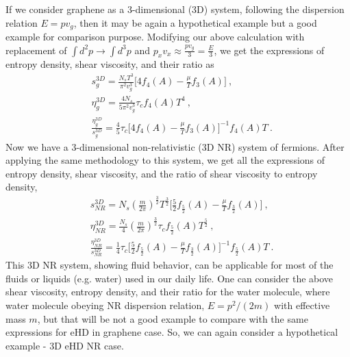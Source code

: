 \documentclass[amsmath,amssymb,aps,prb]{revtex4-2}
\begin{document}
    If we consider graphene as a 3-dimensional (3D) system, following the dispersion relation $E=pv_g$, then it may be again a hypothetical example but a good example for comparison purpose. Modifying our above calculation with replacement of $\int d^2p\rightarrow \int d^3p$ and $p_xv_x\approx \frac{pv_g}{3}=\frac{E}{3}$, we get the expressions of entropy density, shear viscosity, and their ratio as
    \begin{align}
    & s_g^{3D} = \frac{N_s T^3}{\pi^2 v_g^3} \Bigg[4f_4\left(A\right) - \frac{\mu}{T} f_3\left(A\right) \Bigg]~,
    \label{sg_3D}
    \\
    & \eta_{g}^{3D} = \frac{4 N_s }{5 \pi^2 v_g^3} \tau_c f_4\left(A\right) T^4~,
    \label{eg_3D}
    \\
    & \frac{\eta_g^{3D}}{ s_g^{3D}} = \frac{4}{5} \tau_c \Bigg[4f_4\left(A\right) - \frac{\mu}{T} f_3\left(A\right) \Bigg]^{-1}  f_4\left(A\right) T~.
    \label{esg_3D}
    \end{align}
%
    Now we have a 3-dimensional non-relativistic (3D NR) system of fermions. After applying the same methodology to this system, we get all the expressions of entropy density, shear viscosity, and the ratio of shear viscosity to entropy density,
%
    \begin{align}
    & s_{NR}^{3D} = N_s \left( \frac{m}{2 \pi }\right)^{\frac{3}{2}} T^{\frac{3}{2}} \Bigg[\frac{5}{2} f_{\frac{5}{2}}\left(A\right) - \frac{\mu}{T} f_{\frac{3}{2}}\left(A\right) \Bigg]~,
    \label{sNR_3D}
    \\
    & \eta_{NR}^{3D} = \frac{N_s}{4} \left( \frac{m}{2 \pi }\right)^{\frac{3}{2}} \tau_c f_{\frac{5}{2}}\left(A\right) T^{\frac{5}{2}}~,
    \label{eNR_3D}
    \\
     & \frac{\eta_{NR}^{3D}}{ s_{NR}^{3D}} = \frac{1}{4} \tau_c \Bigg[\frac{5}{2} f_{\frac{5}{2}}\left(A\right) - \frac{\mu}{T} f_{\frac{3}{2}}\left(A\right) \Bigg]^{-1} f_{\frac{5}{2}}\left(A\right) T~.
     \label{esNR_3D}
    \end{align}
    This 3D NR system, showing fluid behavior, can be applicable for most of the fluids or liquids (e.g. water) used in our daily life.  
    One can consider the above shear viscosity, entropy density, and their ratio for the water molecule, where water molecule obeying NR dispersion relation, $E=p^2/(2m)$ with effective mass $m$, but that will be not a good example to compare with the same expressions for eHD in graphene case. So, we can again consider a hypothetical example - 3D eHD NR case.
\end{document}
